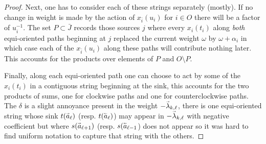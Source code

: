 \documentclass[11pt]{amsart}
\renewcommand{\vec}[1]{\accentset{\shortrightarrow}{#1}}
\newcommand{\cev}[1]{\accentset{\shortleftarrow}{#1}}
\numberwithin{equation}{section}
\begin{document}
{\begin{proof}
    Next, one has to consider each of these strings separately (mostly).  If no change in weight is made by the action of $x_{\bar{i}}(u_i)$ for $i\in O$ there will be a factor of $u_i^{-1}$.  The set $P\subset\bar{J}$ records those sources $j$ where every $x_i(t_i)$ along \emph{both} equi-oriented paths beginning at $j$ replaced the current weight $\omega$ by $\omega+\alpha_i$ in which case each of the $x_{\bar{i}}(u_i)$ along these paths will contribute nothing later.  This accounts for the products over elements of $P$ and $O\setminus P$.

    Finally, along each equi-oriented path one can choose to act by some of the $x_i(t_i)$ in a contiguous string beginning at the sink, this accounts for the two products of sums, one for clockwise paths and one for counterclockwise paths.  The $\delta$ is a slight annoyance present in the weight $-\vec{\lambda}_{k,\ell}$, there is one equi-oriented string whose sink $t(\vec{a}_\ell)$ (resp. $t(\cev{a}_\ell)$) may appear in $-\vec{\lambda}_{k,\ell}$ with negative coefficient but where $s(\vec{a}_{\ell+1})$ (resp. $s(\cev{a}_{\ell-1}$) does not appear so it was hard to find uniform notation to capture that string with the others.
  \end{proof}}%
\end{document}
